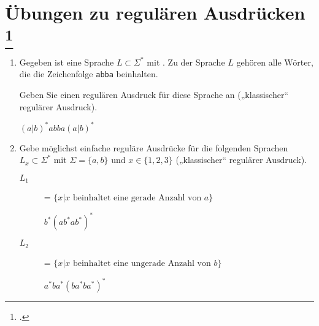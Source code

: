 \documentclass{lehramt-informatik-aufgabe}
\begin{document}
\section{Übungen zu regulären Ausdrücken
\footcite[Seite 21]{theo:fs:1}}

\begin{enumerate}

%

\item Gegeben ist eine Sprache $L \subset \Sigma^*$ mit
. Zu der Sprache $L$ gehören alle Wörter, die die
Zeichenfolge \texttt{abba} beinhalten.

Geben Sie einen regulären Ausdruck für diese Sprache an („klassischer“
regulärer Ausdruck).

\begin{liAntwort}
$(a|b)^*abba(a|b)^*$

\end{liAntwort}

%

\item Gebe möglichst einfache reguläre Ausdrücke für die folgenden
Sprachen $L_x \subset \Sigma^*$ mit $\Sigma = \{ a,b \}$ und $x \in \{1, 2, 3\}$ („klassischer“ regulärer Ausdruck).

\begin{description}

%

\item[$L_1$] = $\{ x | x \text{ beinhaltet eine gerade Anzahl von } a \}$

\begin{liAntwort}
$b^*(ab^*ab^*)^*$

\end{liAntwort}

%

\item[$L_2$] = $\{ x | x \text{ beinhaltet eine ungerade Anzahl von } b \}$

\begin{liAntwort}
$a^*ba^*(ba^*ba^*)^*$

\end{liAntwort}


\end{description}
\end{enumerate}
\end{document}
